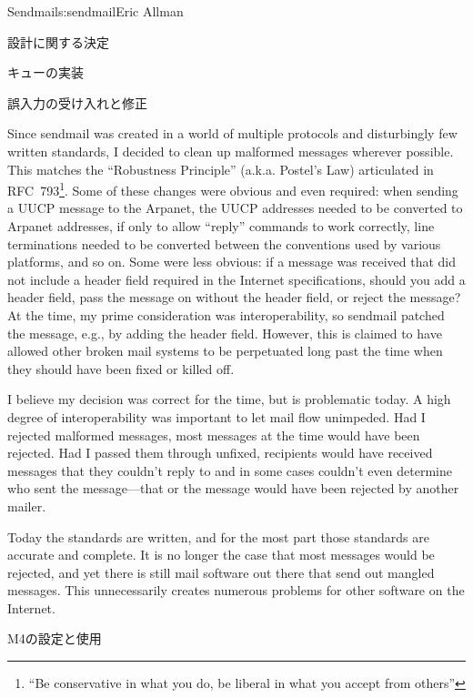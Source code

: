\begin{aosachapter}{Sendmail}{s:sendmail}{Eric Allman}
\begin{aosasect1}{設計に関する決定}
\begin{aosasect2}{キューの実装}
\end{aosasect2}

\begin{aosasect2}{誤入力の受け入れと修正}

Since sendmail was created in a world of multiple protocols and
disturbingly few written standards, I decided to clean up malformed
messages wherever possible.
This matches the ``Robustness Principle'' (a.k.a. Postel's Law)
articulated in RFC~793\footnote{``Be conservative in what you do,
be liberal in what you accept from others''}.
Some of these changes were obvious and even required:
when sending a
UUCP message to the Arpanet, the UUCP addresses needed to be converted
to Arpanet addresses, if only to allow ``reply'' commands to work
correctly,
line terminations needed to be converted between the conventions used
by various platforms, and so on.
Some were less obvious: if a message was received that did
not include a  header field required in the Internet
specifications, should you add a  header field, pass the
message on without the  header field, or reject the message?  At
the time, my prime consideration was interoperability, so sendmail
patched the message, e.g., by adding the  header
field. However, this is claimed to have allowed other broken mail
systems to be perpetuated long past the time when they should have
been fixed or killed off.

I believe my decision was correct for the time, but is problematic
today. A high degree of interoperability was important to let mail
flow unimpeded. Had I rejected malformed messages, most messages at
the time would have been rejected. Had I passed them through unfixed,
recipients would have received messages that they couldn't reply to
and in some cases couldn't even determine who sent the message---that
or the message would have been rejected by another mailer.

Today the standards are written, and for the most part those standards
are accurate and complete. It is no longer the case that most messages
would be rejected, and yet there is still mail software out there that
send out mangled messages. This unnecessarily creates numerous
problems for other software on the Internet.

\end{aosasect2}

\begin{aosasect2}{M4の設定と使用}


\end{aosasect2}
\end{aosasect1}
\end{aosachapter}
